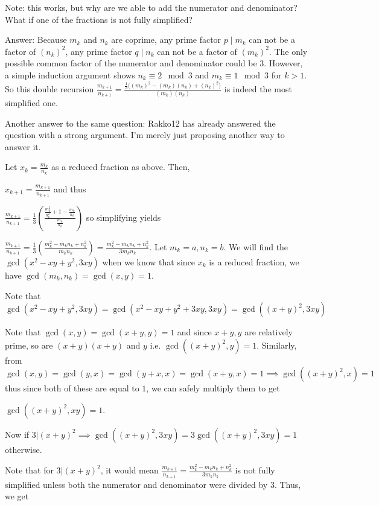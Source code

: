 \begin{enumerate}
 
Note: this works, but why are we able to add the numerator and denominator? What if one of the fractions is not fully simplified?

 Answer: Because $m_k$ and $n_k$ are coprime, any prime factor $p \mid m_k$ can not be a factor of $(n_k)^{2}$, any prime factor $q \mid n_k$ can not be a factor of $(m_k)^{2}$. The only possible common factor of the numerator and denominator could be 3. However, a simple induction argument shows $n_k \equiv 2 \mod 3$ and $m_k \equiv 1 \mod 3$ for $k > 1$. So this double recursion $\frac{m_{k+1}}{n_{k+1}} = \frac{\frac{1}{3}\big((m_k)^{2} - (m_k)(n_k) + (n_k)^{2}\big)}{(m_k)(n_k)}$ is indeed the most simplified one.

 Another answer to the same question: Rakko12 has already answered the question with a strong argument. I'm merely just proposing another way to answer it.

 Let $x_k = \frac{m_k}{n_k}$ as a reduced fraction as above. Then, 

 $x_{k + 1} = \frac{m_{k + 1}}{n_{k + 1}}$ and thus

 $\frac{m_{k + 1}}{n_{k + 1}} = \frac{1}{3}(\frac{\frac{m_k^2}{n_k^2} + 1 - \frac{m_k}{n_k}}{\frac{m_k}{n_k}})$ so simplifying yields

 $\frac{m_{k + 1}}{n_{k + 1}} = \frac{1}{3}(\frac{m_k^2 - m_k n_k + n_k^2}{m_k n_k}) = \frac{m_k^2 - m_k n_k + n_k^2}{3m_k n_k}$. Let $m_k = a, n_k = b$. We will find the $\gcd(x^2 - xy + y^2, 3xy)$ when we know that since $x_k$ is a reduced fraction, we have $\gcd(m_k, n_k) = \gcd(x, y) = 1$.

 Note that $\gcd(x^2 - xy + y^2, 3xy) = \gcd(x^2 - xy + y^2 + 3xy, 3xy) = \gcd((x + y)^2, 3xy)$

 Note that $\gcd(x, y) = \gcd(x + y, y) = 1$ and since $x + y, y$ are relatively prime, so are $(x + y)(x + y)$ and $y$ i.e. $\gcd((x + y)^2, y) = 1$. Similarly, from $\gcd(x, y) = \gcd(y, x) = \gcd(y + x, x) = \gcd(x + y, x) = 1 \implies \gcd((x + y)^2, x) = 1$ thus since both of these are equal to $1$, we can safely multiply them to get

 $\gcd((x + y)^2, xy) = 1$. 

 Now if $3 | (x + y)^2 \implies \gcd((x + y)^2, 3xy) = 3$$\gcd((x + y)^2, 3xy) = 1$ otherwise.

 Note that for $3 | (x + y)^2$, it would mean $\frac{m_{k + 1}}{n_{k + 1}} = \frac{m_k^2 - m_k n_k + n_k^2}{3m_k n_k}$ is not fully simplified unless both the numerator and denominator were divided by $3$. Thus, we get


\end{enumerate}
